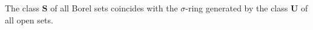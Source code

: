 The class $\mathbf{S}$ of all Borel sets coincides with the $\sigma$-ring generated by the class $\mathbf{U}$ of all open sets.
